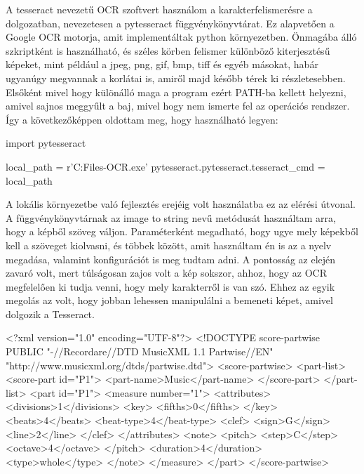 A tesseract nevezetű OCR szoftvert használom a karakterfelismerésre a dolgozatban, nevezetesen a pytesseract függvénykönyvtárat. Ez alapvetően a Google OCR motorja, amit implementáltak python környezetben. Önmagába álló szkriptként is használható, és széles körben felismer különböző kiterjesztésű képeket, mint például a jpeg, png, gif, bmp, tiff és egyéb másokat, habár ugyanúgy megvannak a korlátai is, amiről majd később térek ki részletesebben. Elsőként mivel hogy különálló maga a program ezért PATH-ba kellett helyezni, amivel sajnos meggyűlt a baj, mivel hogy nem ismerte fel az operációs rendszer. Így a következőképpen oldottam meg, hogy használható legyen:
\begin{python}
import pytesseract
	
local_path =  r'C:\Program Files\Tesseract-OCR\tesseract.exe'
pytesseract.pytesseract.tesseract_cmd = local_path
\end{python}
A lokális környezetbe való fejlesztés erejéig volt használatba ez az elérési útvonal. A függvénykönyvtárnak az image to string nevű metódusát használtam arra, hogy a képből szöveg váljon. Paraméterként megadható, hogy ugye mely képekből kell a szöveget kiolvasni, és többek között, amit használtam én is az a nyelv megadása, valamint konfigurációt is meg tudtam adni. A pontosság az elején zavaró volt, mert túlságosan zajos volt a kép sokszor, ahhoz, hogy az OCR megfelelően ki tudja venni, hogy mely karakterről is van szó. Ehhez az egyik megolás az volt, hogy jobban lehessen manipulálni a bemeneti képet, amivel dolgozik a Tesseract.
\newpage
{}
\begin{xml}
<?xml version="1.0" encoding="UTF-8"?>
<!DOCTYPE score-partwise PUBLIC "-//Recordare//DTD MusicXML 1.1 Partwise//EN" "http://www.musicxml.org/dtds/partwise.dtd">
<score-partwise>
   <part-list>
      <score-part id="P1">
         <part-name>Music</part-name>
      </score-part>
   </part-list>
   <part id="P1">
      <measure number="1">
         <attributes>
            <divisions>1</divisions>
            <key>
               <fifths>0</fifths>
            </key>
            <beats>4</beats>
            <beat-type>4</beat-type>
            <clef>
               <sign>G</sign>
               <line>2</line>
            </clef>
         </attributes>
         <note>
            <pitch>
               <step>C</step>
               <octave>4</octave>
            </pitch>
            <duration>4</duration>
            <type>whole</type>
         </note>
      </measure>
   </part>
</score-partwise>
\end{xml}

